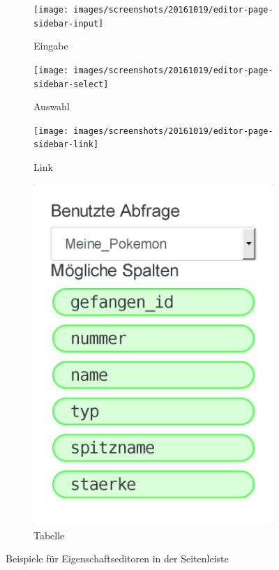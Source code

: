 \begin{figure}[p]
  \begin{subfigure}[b]{0.45\textwidth}
    \texttt{[image: images/screenshots/20161019/editor-page-sidebar-input]}
    \caption{Eingabe}
    \label{fig:sidebar-property-editor-input}
  \end{subfigure}\hfill
  \begin{subfigure}[b]{0.45\textwidth}
    \texttt{[image: images/screenshots/20161019/editor-page-sidebar-select]}
    \caption{Auswahl}
    \label{fig:sidebar-property-editor-select}
  \end{subfigure}

  \begin{subfigure}[b]{0.45\textwidth}
    \texttt{[image: images/screenshots/20161019/editor-page-sidebar-link]}
    \caption{Link}
    \label{fig:sidebar-property-editor-link}
  \end{subfigure}\hfill
  \begin{subfigure}[b]{0.45\textwidth}
    \includegraphics[width=\textwidth-2pt, frame]{images/screenshots/20161019/editor-page-sidebar-table}
    \caption{Tabelle}
    \label{fig:sidebar-property-editor-table}
  \end{subfigure}
  
  \caption{Beispiele für Eigenschaftseditoren in der Seitenleiste}
  \label{fig:sidebar-property-editor}
\end{figure}

